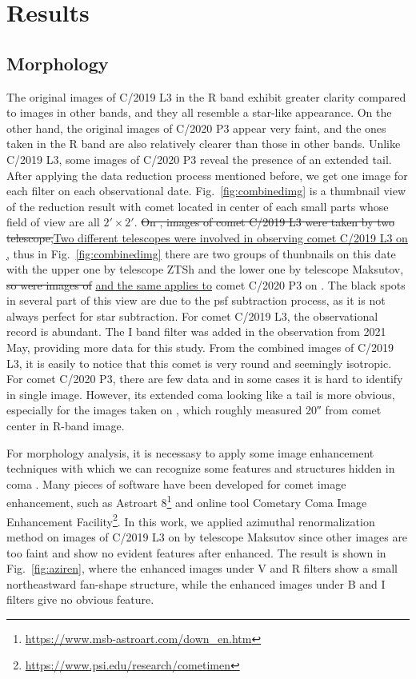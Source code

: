 \section{Results} \label{sec:res}

\subsection{Morphology}

The original images of C/2019 L3 in the R band exhibit greater clarity compared to images in other bands, and they all resemble a star-like appearance. On the other hand, the original images of C/2020 P3 appear very faint, and the ones taken in the R band are also relatively clearer than those in other bands. Unlike C/2019 L3, some images of C/2020 P3 reveal the presence of an extended tail. After applying the data reduction process mentioned before, we get one image for each filter on each observational date. Fig.~\ref{fig:combinedimg} is a thumbnail view of the reduction result with comet located in center of each small parts whose field of view are all $\ang{;2;} \times \ang{;2;}$. \st{On , images of comet C/2019 L3  were taken by two telescope,}\ul{Two different telescopes were involved in observing comet C/2019 L3 on ,} thus in Fig.~\ref{fig:combinedimg} there are two groups of thunbnails on this date with the upper one by telescope ZTSh and the lower one by telescope Maksutov, \st{so were images of} \ul{and the same applies to} comet C/2020 P3 on . The black spots in several part of this view are due to the psf subtraction process, as it is not always perfect for star subtraction. For comet C/2019 L3, the observational record is abundant. The I band filter was added in the observation from 2021 May, providing more data for this study. From the combined images of C/2019 L3, it is easily to notice that this comet is very round and seemingly isotropic. For comet C/2020 P3, there are few data and in some cases it is hard to identify in single image. However, its extended coma looking like a tail is more obvious, especially for the images taken on , which roughly measured \ang{;;20} from comet center in R-band image. 

For morphology analysis, it is necessasy to apply some image enhancement techniques with which we can recognize some features and structures hidden in coma \citep{samarasinha_image_2014}. Many pieces of software have been developed for comet image enhancement, such as Astroart 8\footnote{\href{https://www.msb-astroart.com/down_en.htm}{https://www.msb-astroart.com/down\_en.htm}} and online tool Cometary Coma Image Enhancement Facility\footnote{\href{https://www.psi.edu/research/cometimen}{https://www.psi.edu/research/cometimen}}. In this work, 
we applied azimuthal renormalization method on images of C/2019 L3 on  by telescope Maksutov since other images are too faint and show no evident features after enhanced. The result is shown in Fig.~\ref{fig:aziren}, where the enhanced images under V and R filters show a small northeastward fan-shape structure, while the enhanced images under B and I filters give no obvious feature.  

